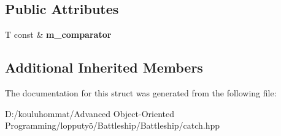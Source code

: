 \subsection*{Public Attributes}
\begin{DoxyCompactItemize}
\item 
\mbox{\label{struct_catch_1_1_matchers_1_1_vector_1_1_contains_element_matcher_ab7eada6c4bbce1d21b44773262f9cb23}} 
T const  \& {\bfseries m\+\_\+comparator}
\end{DoxyCompactItemize}
\subsection*{Additional Inherited Members}


The documentation for this struct was generated from the following file\+:\begin{DoxyCompactItemize}
\item 
D\+:/kouluhommat/\+Advanced Object-\/\+Oriented Programming/lopputyö/\+Battleship/\+Battleship/catch.\+hpp\end{DoxyCompactItemize}
